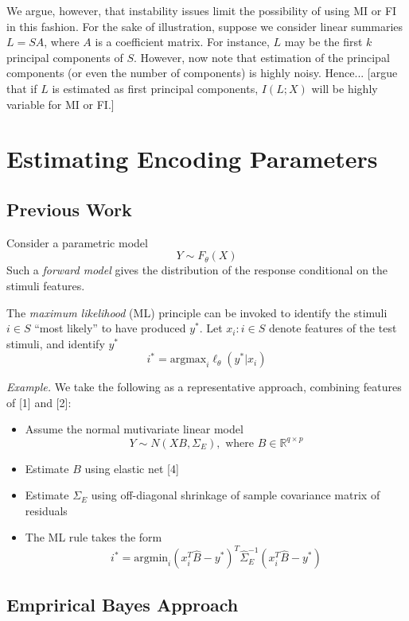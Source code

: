 \documentclass[12pt]{article}
\begin{document}
We argue, however, that instability issues limit the possibility of
using MI or FI in this fashion.  For the sake of illustration, suppose
we consider linear summaries $L = SA$, where $A$ is a coefficient
matrix.  For instance, $L$ may be the first $k$ principal components
of $S$.  However, now note that estimation of the principal components
(or even the number of components) is highly noisy.  Hence... [argue
that if $L$ is estimated as first principal components, $I(L; X)$ will
be highly variable for MI or FI.]


\section{Estimating Encoding Parameters}

\subsection{Previous Work}

Consider a parametric model
\[
Y \sim F_\theta(X)
\]
Such a \emph{forward model} gives the distribution of the
response conditional on the stimuli features.

The \emph{maximum likelihood} (ML) principle can be invoked to
identify the stimuli $i \in S$ ``most likely'' to have produced $y^*$.
Let $x_i : i \in S$ denote features of the test stimuli, and
identify $y^*$
\[
i^* = \text{argmax}_i \ell_\theta(y^*| x_i)
\]

\emph{Example.} We take the following as a representative approach, combining features of [1] and [2]:
\begin{itemize}
\item Assume the normal mutivariate linear model
\[Y \sim N( XB , \Sigma_E), \text{ where }B \in \mathbb{R}^{q \times p}\]
\item Estimate $B$ using elastic net [4]
\item Estimate $\Sigma_E$ using off-diagonal shrinkage of sample covariance matrix of residuals
\item The ML rule takes the form
\begin{equation}\label{mlrule}
i^* = \text{argmin}_{i} (x_i^T \hat{B} - y^*)^T \hat{\Sigma}_E^{-1} (x_i^T \hat{B} - y^*)
\end{equation}
\end{itemize}

\subsection{Emprirical Bayes Approach}
\end{document}
